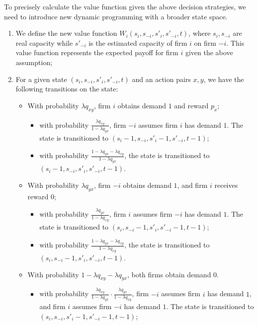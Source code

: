 \documentclass[12pt,letterpaper]{article}
\begin{document}
To precisely calculate the value function given the above decision strategies, we need to introduce new dynamic programming with a broader state space.

\begin{enumerate}
    \item We define the new value function $W_i(s_i,s_{-i},s'_i,s'_{-i},t)$, where $s_i,s_{-i}$ are real capacity while $s'_{-i}$ is the estimated capacity of firm $i$ on firm $-i$. This value function represents the expected payoff for firm $i$ given the above assumption;
    \item For a given state $(s_i,s_{-i},s'_i,s'_{-i},t)$ and an action pairs $x, y$, we have the following transitions on the state:
    \begin{itemize}
        \item With probability $\lambda q_{xy}$, firm $i$ obtains demand $1$ and reward $p_x$;
            \begin{itemize}
                \item with probability $\frac{\lambda q_{xy}}{1-\lambda q_{yx}}$, firm $-i$ assumes firm $i$ has demand $1$. The state is transitioned to $(s_i-1,s_{-i},s'_i-1,s'_{-i},t-1)$;
                \item with probability $\frac{1-\lambda q_{yx}-\lambda q_{xy}}{1-\lambda q_{yx}}$, the state is transitioned to $(s_i-1,s_{-i},s'_i,s'_{-i},t-1)$.
            \end{itemize}
        \item With probability $\lambda q_{yx}$, firm $-i$ obtains demand $1$, and firm $i$ receives reward $0$;
            \begin{itemize}
                \item with probability $\frac{\lambda q_{yx}}{1-\lambda q_{xy}}$, firm $i$ assumes firm $-i$ has demand $1$. The state is transitioned to $(s_i,s_{-i}-1,s'_i,s'_{-i}-1,t-1)$;
                \item with probability $\frac{1-\lambda q_{yx}-\lambda q_{xy}}{1-\lambda q_{xy}}$, the state is transitioned to $(s_i,s_{-i}-1,s'_i,s'_{-i},t-1)$.
            \end{itemize}
        \item With probability $1-\lambda q_{xy} - \lambda q_{yx} $, both firms obtain demand $0$.
            \begin{itemize}
                \item with probability $\frac{\lambda q_{xy}}{1-\lambda q_{yx}} \cdot \frac{\lambda q_{yx}}{1-\lambda q_{xy}}$, firm $-i$ assumes firm $i$ has demand $1$, and firm $i$ assumes firm $-i$ has demand $1$. The state is transitioned to $(s_i,s_{-i},s'_i-1,s'_{-i}-1,t-1)$;

\end{itemize}
\end{itemize}
\end{enumerate}
\end{document}
